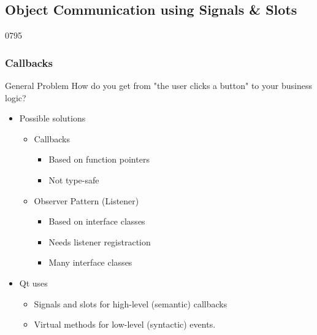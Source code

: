 %
%
%
%

\subsection{Object Communication using Signals \& Slots}

\begin{slide}[fragile]{0795}\frametitle{Callbacks}
  \begin{block}{General Problem}
    How do you get from "the user clicks a button" to your business logic?
  \end{block}
  \begin{itemize}
 \item Possible solutions
    \begin{itemize}
    \item Callbacks
      \begin{itemize}
      \item Based on function pointers
      \item Not type-safe
     \end{itemize}
    \item Observer Pattern (Listener)
      \begin{itemize}
      \item Based on interface classes
      \item Needs listener registraction
      \item Many interface classes
      \end{itemize}  
    \end{itemize}
  \item Qt uses
    \begin{itemize}
    \item Signals and slots for high-level (semantic) callbacks
    \item Virtual methods for low-level (syntactic) events.
    \end{itemize}
  \end{itemize}
\end{slide}

